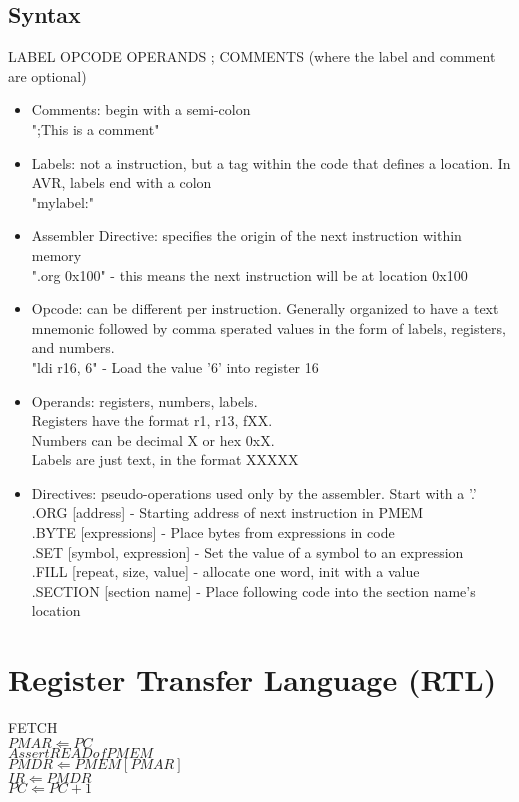 \documentclass{article}
\begin{document}
\subsection{Syntax}
LABEL OPCODE OPERANDS ; COMMENTS (where the label and comment are optional)
\begin{itemize}
  \item Comments: begin with a semi-colon\\
  ";This is a comment"
  \item Labels: not a instruction, but a tag within the code that defines a location. In AVR, labels end with a colon\\
  "mylabel:"
  \item Assembler Directive: specifies the origin of the next instruction within memory\\
  ".org 0x100" - this means the next instruction will be at location 0x100
  \item Opcode: can be different per instruction. Generally organized to have a text mnemonic followed by comma sperated values in the form of labels, registers, and numbers.\\
  "ldi r16, 6" - Load the value '6' into register 16
  \item Operands: registers, numbers, labels.\\
  Registers have the format r1, r13, fXX.\\
  Numbers can be decimal X or hex 0xX.\\
  Labels are just text, in the format XXXXX
  \item Directives: pseudo-operations used only by the assembler. Start with a '.'\\
  .ORG [address] - Starting address of next instruction in PMEM\\
  .BYTE [expressions] - Place bytes from expressions in code\\
  .SET [symbol, expression] - Set the value of a symbol to an expression\\
  .FILL [repeat, size, value] - allocate one word, init with a value\\
  .SECTION [section name] - Place following code into the section name's location
\end{itemize}

\section{Register Transfer Language (RTL)}
FETCH\\
$PMAR \Leftarrow PC$\\
$Assert READ of PMEM$\\
$PMDR \Leftarrow PMEM[PMAR]$\\
$IR \Leftarrow PMDR$\\
$PC \Leftarrow PC + 1$
\end{document}

